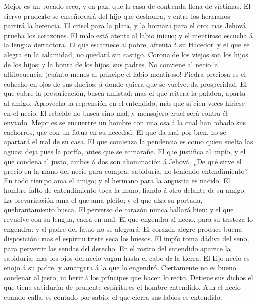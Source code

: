  Mejor es un bocado seco, y en paz, que la casa de contienda
llena de víctimas.  El siervo prudente se enseñoreará del
hijo que deshonra, y entre los hermanos partirá la herencia.
 El crisol para la plata, y la hornaza para el oro: mas
Jehová prueba los corazones.  El malo está atento al labio
inicuo; y el mentiroso escucha á la lengua detractora.  El
que escarnece al pobre, afrenta á su Hacedor: y el que se alegra en la
calamidad, no quedará sin castigo.  Corona de los viejos son
los hijos de los hijos; y la honra de los hijos, sus padres.
 No conviene al necio la altilocuencia: ¡cuánto menos al
príncipe el labio mentiroso!  Piedra preciosa es el cohecho
en ojos de sus dueños: á donde quiera que se vuelve, da prosperidad.
 El que cubre la prevaricación, busca amistad: mas el que
reitera la palabra, aparta al amigo.  Aprovecha la
reprensión en el entendido, más que si cien veces hiriese en el necio.
 El rebelde no busca sino mal; y mensajero cruel será
contra él enviado.  Mejor es se encuentre un hombre con una
osa á la cual han robado sus cachorros, que con un fatuo en su necedad.
 El que da mal por bien, no se apartará el mal de su casa.
 El que comienza la pendencia es como quien suelta las
aguas: deja pues la porfía, antes que se enmarañe.  El que
justifica al impío, y el que condena al justo, ambos á dos son
abominación á Jehová.  ¿De qué sirve el precio en la mano
del necio para comprar sabiduría, no teniendo entendimiento?
 En todo tiempo ama el amigo; y el hermano para la angustia
es nacido.  El hombre falto de entendimiento toca la mano,
fiando á otro delante de su amigo.  La prevaricación ama el
que ama pleito; y el que alza su portada, quebrantamiento busca.
 El perverso de corazón nunca hallará bien: y el que
revuelve con su lengua, caerá en mal.  El que engendra al
necio, para su tristeza lo engendra: y el padre del fatuo no se
alegrará.  El corazón alegre produce buena disposición: mas
el espíritu triste seca los huesos.  El impío toma dádiva
del seno, para pervertir las sendas del derecho.  En el
rostro del entendido aparece la sabiduría: mas los ojos del necio vagan
hasta el cabo de la tierra.  El hijo necio es enojo á su
padre, y amargura á la que lo engendró.  Ciertamente no es
bueno condenar al justo, ni herir á los príncipes que hacen lo recto.
 Detiene sus dichos el que tiene sabiduría: de prudente
espíritu es el hombre entendido.  Aun el necio cuando
calla, es contado por sabio: el que cierra sus labios es entendido.

